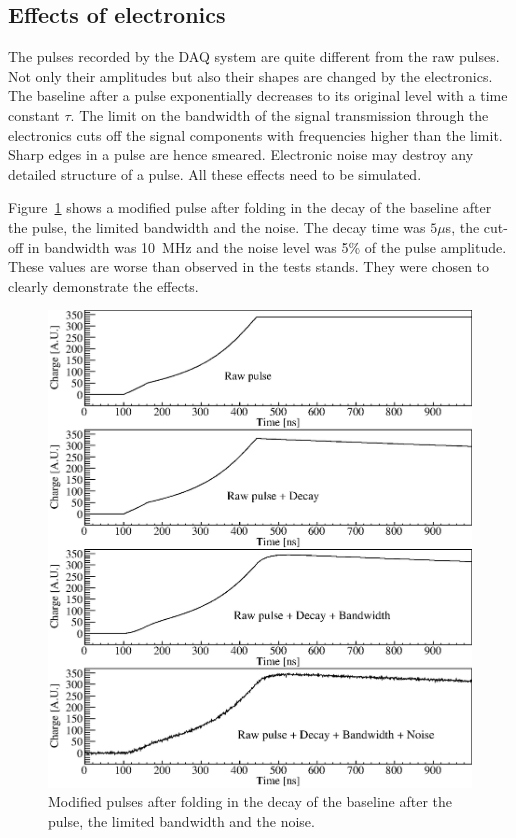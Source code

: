 \documentclass[epj]{svjour}
\begin{document}
\subsection{Effects of electronics} 
\label{s:dbn}
The pulses recorded by the DAQ system are quite different from the raw
pulses. Not only their amplitudes but also their shapes are changed by
the electronics. The baseline after a pulse exponentially decreases to
its original level with a time constant $\tau$. The limit on the
bandwidth of the signal transmission through the electronics cuts off
the signal components with frequencies higher than the limit. Sharp
edges in a pulse are hence smeared. Electronic noise may destroy any
detailed structure of a pulse. All these effects need to be simulated.
 
Figure~\ref{f:elec} shows a modified pulse after folding in the decay
of the baseline after the pulse, the limited bandwidth and the
noise. The decay time was $5 \mu$s, the cut-off in bandwidth was
10~MHz and the noise level was 5\% of the pulse amplitude. These
values are worse than observed in the tests stands. They were chosen
to clearly demonstrate the effects.
\begin{figure}[htpb]
\centering
\includegraphics[width=\linewidth]{PSDBN} 
\caption{Modified pulses after folding in the decay of the baseline
after the pulse, the limited bandwidth and the noise.}
\label{f:elec} 
\end{figure}
\end{document}
